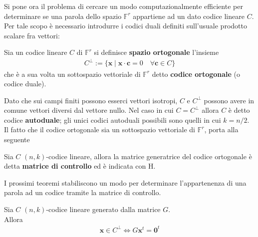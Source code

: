 Si pone ora il problema di cercare un modo computazionalmente efficiente per determinare se una parola dello spazio $ \mathbb{F}^{r} $ appartiene ad un dato codice lineare $C$. Per tale scopo è necessario introdurre i codici duali definiti sull'usuale prodotto scalare fra vettori:
\begin{definizione}
   Sia un codice lineare $C$ di $\mathbb{F}^{r}$ si definisce {\bf spazio ortogonale} l'insieme
   \begin{align*}
      C^{\perp}
      := \lbrace \mathbf{x} \mid \mathbf{x} \cdot \mathbf{c} = 0 \quad \forall \mathbf{c} \in C \rbrace
   \end{align*}
   che è a sua volta un sottospazio vettoriale di $\mathbb{F}^{r}$ detto {\bf codice ortogonale} (o codice duale).
\end{definizione}
\noindent
Dato che sui campi finiti possono esserci vettori isotropi, $C$ e $C^{\perp}$ possono avere in comune vettori diversi dal vettore nullo. Nel caso in cui $C = C^{\perp}$ allora $C$ è detto codice {\bf autoduale}; gli unici codici autoduali possibili sono quelli in cui $k=n/2$. Il fatto che il codice ortogonale sia un sottospazio vettoriale di $\mathbb{F}^{r}$, porta alla seguente
\begin{definizione}
   Sia $C$ $(n,k)$-codice lineare, allora la matrice generatrice del codice ortogonale è detta {\bf matrice di controllo} ed è indicata con H.
\end{definizione}
\noindent
I prossimi teoremi stabiliscono un modo per determinare l'appartenenza di una parola ad un codice tramite la matrice di controllo.
\begin{teorema} \label{teorFondMatrGen}
   Sia $C$ $(n,k)$-codice lineare generato dalla matrice $G$.\\
   Allora
   \begin{align*}
      \mathbf{x} \in C^{\perp} \iff G \mathbf{x}^{t} = \mathbf{0}^{t}
   \end{align*}
\end{teorema}
